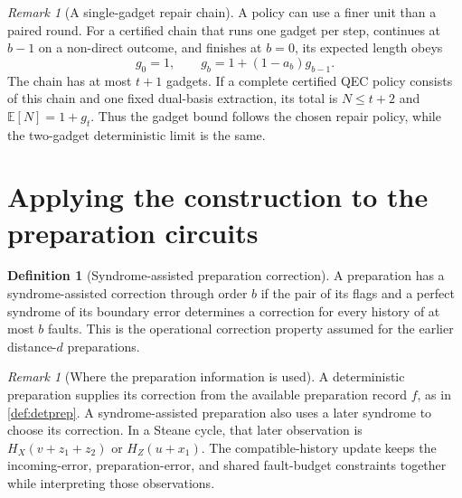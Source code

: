 \documentclass[11pt,a4paper]{article}
\theoremstyle{definition}
\newtheorem{definition}[theorem]{Definition}
\theoremstyle{remark}
\newtheorem{remark}[theorem]{Remark}
\begin{document}
\begin{remark}[A single-gadget repair chain]
A policy can use a finer unit than a paired round. For a certified chain
that runs one gadget per step, continues at $b-1$ on a non-direct outcome,
and finishes at $b=0$, its expected length obeys
\[
 g_0=1,\qquad g_b=1+(1-a_b)g_{b-1}.
\]
The chain has at most $t+1$ gadgets. If a complete certified QEC policy
consists of this chain and one fixed dual-basis extraction, its total is
$N\leq t+2$ and $\mathbb E[N]=1+g_t$. Thus the gadget bound follows the
chosen repair policy, while the two-gadget deterministic limit is the
same.
\end{remark}
\FloatBarrier

\section{Applying the construction to the preparation circuits}
\label{sec:application}

\begin{definition}[Syndrome-assisted preparation correction]
A preparation has a syndrome-assisted correction through order $b$ if
the pair of its flags and a perfect syndrome of its boundary error
determines a correction for every history of at most $b$ faults.
This is the operational correction property assumed for the earlier
distance-$d$ preparations.
\end{definition}

\begin{remark}[Where the preparation information is used]
A deterministic preparation supplies its correction from the available
preparation record $f$, as in \cref{def:detprep}.
A syndrome-assisted preparation also uses a later syndrome to choose its
correction. In a Steane cycle, that later observation is
$H_X(v+z_1+z_2)$ or $H_Z(u+x_1)$.
The compatible-history update keeps the incoming-error, preparation-error,
and shared fault-budget constraints together while interpreting those
observations.
\end{remark}
\end{document}
